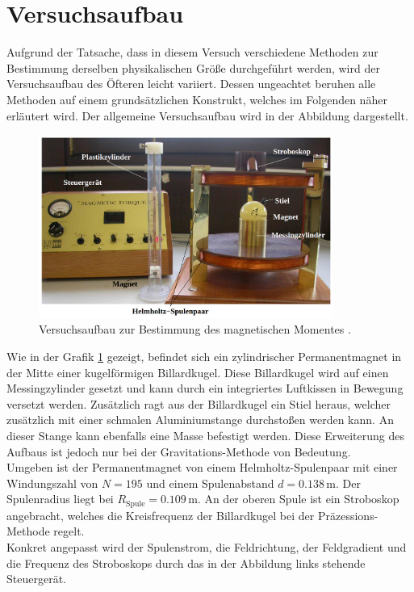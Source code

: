 %

%
\section{Versuchsaufbau}

\noindent Aufgrund der Tatsache, dass in diesem Versuch verschiedene Methoden zur Bestimmung derselben physikalischen Größe 
durchgeführt werden, wird der Versuchsaufbau des Öfteren leicht variiert. Dessen ungeachtet beruhen alle Methoden auf 
einem grundsätzlichen Konstrukt, welches im Folgenden näher erläutert wird. Der allgemeine Versuchsaufbau wird in der 
Abbildung dargestellt.

\begin{figure}[H]
    \centering
    \includegraphics[height=6cm]{./content/aufbau.png}
    \caption{Versuchsaufbau zur Bestimmung des magnetischen Momentes \cite{Versuchsanleitung_v105}.}
    \label{fig:aufbau_moment}
\end{figure}

\noindent Wie in der Grafik \ref{fig:aufbau_moment} gezeigt, befindet sich ein zylindrischer Permanentmagnet in der Mitte einer 
kugelförmigen Billardkugel. Diese Billardkugel wird auf einen Messingzylinder gesetzt und kann durch ein integriertes Luftkissen
in Bewegung versetzt werden. Zusätzlich ragt aus der Billardkugel ein Stiel heraus, welcher zusätzlich mit einer schmalen 
Aluminiumstange durchstoßen werden kann. An dieser Stange kann ebenfalls eine Masse befestigt werden. Diese Erweiterung des 
Aufbaus ist jedoch nur bei der Gravitations-Methode von Bedeutung.\\
Umgeben ist der Permanentmagnet von einem Helmholtz-Spulenpaar mit einer Windungszahl von $N = 195$ und einem Spulenabstand 
$d = 0.138\,\unit{\meter}$. Der Spulenradius liegt bei $R_\text{Spule} = 0.109\,\unit{\meter}$. An der oberen Spule ist 
ein Stroboskop angebracht, welches die Kreisfrequenz der Billardkugel bei der Präzessions-Methode regelt.\\
Konkret angepasst wird der Spulenstrom, die Feldrichtung, der Feldgradient und die Frequenz des Stroboskops durch das in der 
Abbildung links stehende Steuergerät.


